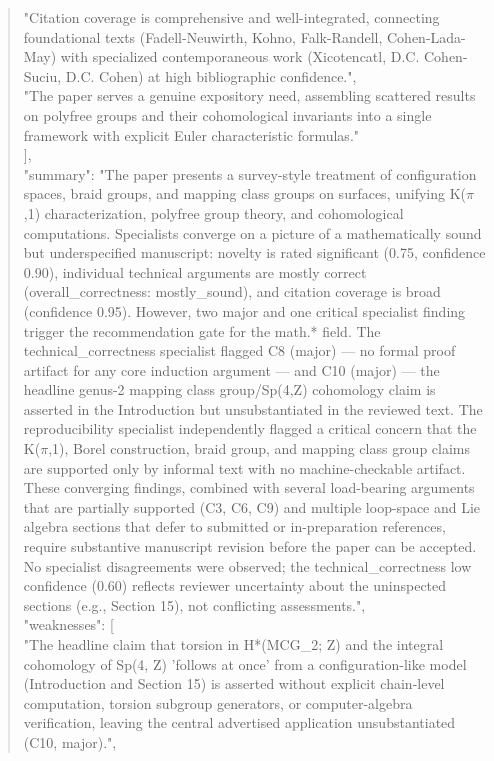 \documentclass[11pt]{article}
\begin{document}
\begin{quote}
    "Citation coverage is comprehensive and well-integrated, connecting foundational texts (Fadell-Neuwirth, Kohno, Falk-Randell, Cohen-Lada-May) with specialized contemporaneous work (Xicotencatl, D.C. Cohen-Suciu, D.C. Cohen) at high bibliographic confidence.",\\
    "The paper serves a genuine expository need, assembling scattered results on polyfree groups and their cohomological invariants into a single framework with explicit Euler characteristic formulas."\\
  ],\\
  "summary": "The paper presents a survey-style treatment of configuration spaces, braid groups, and mapping class groups on surfaces, unifying K(\ensuremath{\pi},1) characterization, polyfree group theory, and cohomological computations. Specialists converge on a picture of a mathematically sound but underspecified manuscript: novelty is rated significant (0.75, confidence 0.90), individual technical arguments are mostly correct (overall\_correctness: mostly\_sound), and citation coverage is broad (confidence 0.95). However, two major and one critical specialist finding trigger the recommendation gate for the math.* field. The technical\_correctness specialist flagged C8 (major) --- no formal proof artifact for any core induction argument --- and C10 (major) --- the headline genus-2 mapping class group/Sp(4,Z) cohomology claim is asserted in the Introduction but unsubstantiated in the reviewed text. The reproducibility specialist independently flagged a critical concern that the K(\ensuremath{\pi},1), Borel construction, braid group, and mapping class group claims are supported only by informal text with no machine-checkable artifact. These converging findings, combined with several load-bearing arguments that are partially supported (C3, C6, C9) and multiple loop-space and Lie algebra sections that defer to submitted or in-preparation references, require substantive manuscript revision before the paper can be accepted. No specialist disagreements were observed; the technical\_correctness low confidence (0.60) reflects reviewer uncertainty about the uninspected sections (e.g., Section 15), not conflicting assessments.",\\
  "weaknesses": [\\
    "The headline claim that torsion in H*(MCG\_2; Z) and the integral cohomology of Sp(4, Z) 'follows at once' from a configuration-like model (Introduction and Section 15) is asserted without explicit chain-level computation, torsion subgroup generators, or computer-algebra verification, leaving the central advertised application unsubstantiated (C10, major).",\\

\end{quote}
\end{document}
